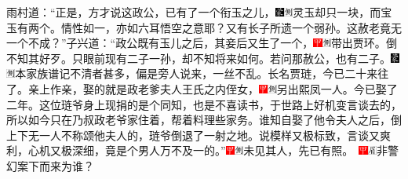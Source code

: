 {雨村道：``正是，方才说这政公，已有了一个衔玉之儿，{\includegraphics[width=3mm]{../Images/00006}\includegraphics[width=3mm]{../Images/00011}\footnotesize \kaishu 灵玉却只一块，而宝玉有两个。情性如一，亦如六耳悟空之意耶？}又有长子所遗一个弱孙。这赦老竟无一个不成？''子兴道：``政公既有玉儿之后，其妾后又生了一个，{\includegraphics[width=3mm]{../Images/00002}\includegraphics[width=3mm]{../Images/00011}\footnotesize \kaishu 带出贾环。}倒不知其好歹。只眼前现有二子一孙，却不知将来如何。若问那赦公，也有二子。{\includegraphics[width=3mm]{../Images/00006}\includegraphics[width=3mm]{../Images/00011}\footnotesize \kaishu 本家族谱记不清者甚多，偏是旁人说来，一丝不乱。}长名贾琏，今已二十来往了。亲上作亲，娶的就是政老爹夫人王氏之内侄女，{\includegraphics[width=3mm]{../Images/00002}\includegraphics[width=3mm]{../Images/00011}\footnotesize \kaishu 另出熙凤一人。}今已娶了二年。这位琏爷身上现捐的是个同知，也是不喜读书，于世路上好机变言谈去的，所以如今只在乃叔政老爷家住着，帮着料理些家务。谁知自娶了他令夫人之后，倒上下无一人不称颂他夫人的，琏爷倒退了一射之地。说模样又极标致，言谈又爽利，心机又极深细，竟是个男人万不及一的。''{\includegraphics[width=3mm]{../Images/00002}\includegraphics[width=3mm]{../Images/00011}\footnotesize \kaishu 未见其人，先已有照。　\includegraphics[width=3mm]{../Images/00002}\includegraphics[width=3mm]{../Images/00010}\footnotesize \kaishu 非警幻案下而来为谁？}

}
